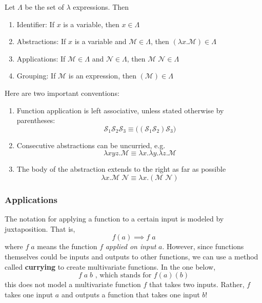   \begin{definition}
    \label{def:lambda-expression}
  Let $\Lambda$ be the set of $\lambda$ expressions. Then 
  \begin{enumerate}
      \item Identifier: If $x$ is a variable, then $x \in \Lambda$ 
      \item Abstractions: If $x$ is a variable and $\mathcal{M} \in \Lambda$, then $(\lambda x.\mathcal{M}) \in \Lambda$
      \item Applications: If $\mathcal{M} \in \Lambda$ and $\mathcal{N} \in \Lambda$, then $\mathcal{M}\;\mathcal{N} \in \Lambda$
      \item Grouping: If $\mathcal{M}$ is an expression, then $( \mathcal{M}) \in \Lambda$
  \end{enumerate}
  Here are two important conventions: 
  \begin{enumerate}
      \item Function application is left associative, unless stated otherwise by parentheses:
      \begin{equation}
        \mathcal{S}_1 \mathcal{S}_2 \mathcal{S}_3 \equiv \big( (\mathcal{S}_1 \mathcal{S}_2) \mathcal{S}_3 \big)
      \end{equation}
      \item Consecutive abstractions can be uncurried, e.g. 
      \begin{equation}
        \lambda x y z . \mathcal{M} \equiv \lambda x . \lambda y . \lambda z . \mathcal{M}
      \end{equation}
      \item The body of the abstraction extends to the right as far as possible 
      \begin{equation}
        \lambda x . \mathcal{M} \; \mathcal{N} \equiv \lambda x . ( \mathcal{M}\; \mathcal{N})
      \end{equation}
  \end{enumerate}
  \end{definition}

  \subsubsection{Applications}
  The notation for applying a function to a certain input is modeled by juxtaposition. That is, 
  \begin{equation}
    f(a) \implies f\;a
  \end{equation}
  where $f \;a$ means the function $f$ \textit{applied on input} $a$. However, since functions themselves could be inputs and outputs to other functions, we can use a method called \textbf{currying} to create multivariate functions. In the one below, 
  \begin{equation}
    f\;a\;b \text{   , which stands for } f(a)(b)
  \end{equation}
  this does not model a multivariate function $f$ that takes two inputs. Rather, $f$ takes one input $a$ and outputs a function that takes one input $b$! 

